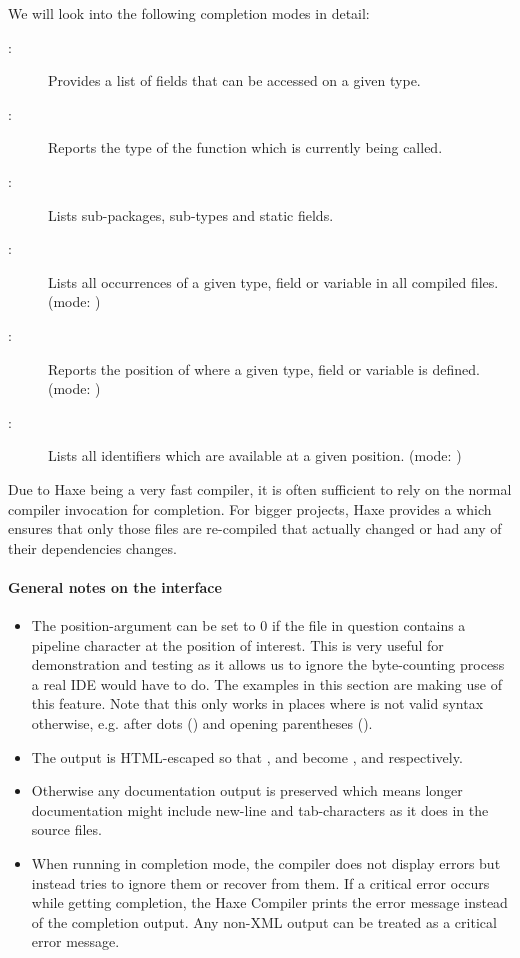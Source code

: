 We will look into the following completion modes in detail:

\begin{description}
	\item[:] Provides a list of fields that can be accessed on a given type.
	\item[:] Reports the type of the function which is currently being called.
	\item[:] Lists sub-packages, sub-types and static fields.
	\item[:] Lists all occurrences of a given type, field or variable in all compiled files. (mode: )
	\item[:] Reports the position of where a given type, field or variable is defined. (mode: )
	\item[:] Lists all identifiers which are available at a given position. (mode: )
\end{description}

Due to Haxe being a very fast compiler, it is often sufficient to rely on the normal compiler invocation for completion. For bigger projects, Haxe provides a  which ensures that only those files are re-compiled that actually changed or had any of their dependencies changes.

\paragraph{General notes on the interface}
\label{cr-completion-interface-notes}

\begin{itemize}
	\item The position-argument can be set to 0 if the file in question contains a pipeline \ic{|} character at the position of interest. This is very useful for demonstration and testing as it allows us to ignore the byte-counting process a real IDE would have to do. The examples in this section are making use of this feature. Note that this only works in places where \ic{|} is not valid syntax otherwise, e.g. after dots () and opening parentheses (\ic{(|}).
	\item The output is HTML-escaped so that \ic{\&}, \ic{<} and \ic{>} become ,  and  respectively.
	\item Otherwise any documentation output is preserved which means longer documentation might include new-line and tab-characters as it does in the source files.
	\item When running in completion mode, the compiler does not display errors but instead tries to ignore them or recover from them.  If a critical error occurs while getting completion, the Haxe Compiler prints the error message instead of the completion output. Any non-XML output can be treated as a critical error message.
\end{itemize}

